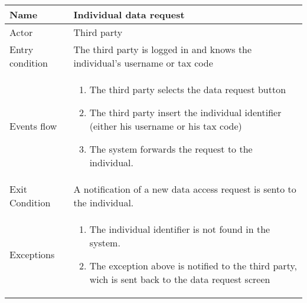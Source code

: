\begin{tabular}{|l|p{13cm}|}
    \hline
    Name & Individual data request
    \\ \hline
    Actor & Third party
    \\ \hline 
    Entry condition & The third party is logged in and knows the individual's username or tax code
        \\ \hline
    Events flow &
    \begin{enumerate}
    \item The third party selects the data request button
	\item The third party insert the individual identifier (either his username or his tax code)
	\item The system forwards the request to the individual.
    \end{enumerate}
     \\ \hline
     Exit Condition & A notification of a new data access request is sento to the individual.
     \\
    \hline
    Exceptions &
        \begin{enumerate}
    \item The individual identifier is not found in the system.
    \item The exception above is notified to the third party, wich is sent back to the data request screen
    \end{enumerate}
        \\  \hline

\end{tabular}



